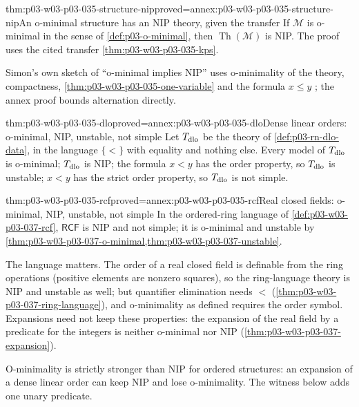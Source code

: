 \begin{hbcorollary}{thm:p03-w03-p03-035-structure-nip}{proved=annex:p03-w03-p03-035-structure-nip}{An o-minimal structure has an NIP theory, given the transfer}
If \(\mathcal M\) is o-minimal in the sense of \cref{def:p03-o-minimal}, then
\(\operatorname{Th}(\mathcal M)\) is NIP.  The proof uses the cited transfer
\cref{thm:p03-w03-p03-035-kps}.
\end{hbcorollary}

Simon's own sketch of ``o-minimal implies NIP'' uses o-minimality of the
theory, compactness, \cref{thm:p03-w03-p03-035-one-variable} and the
formula \(x\leq y\) \cite[Example~2.12, p.~17]{Simon2015GuideManuscript}; the
annex proof bounds alternation directly.

\begin{hbtheorem}{thm:p03-w03-p03-035-dlo}{proved=annex:p03-w03-p03-035-dlo}{Dense linear orders: o-minimal, NIP, unstable, not simple}
Let \(T_{\rm dlo}\) be the theory of \cref{def:p03-rn-dlo-data}, in the
language \(\{<\}\) with equality and nothing else.  Every model of
\(T_{\rm dlo}\) is o-minimal; \(T_{\rm dlo}\) is NIP; the formula \(x<y\) has
the order property, so \(T_{\rm dlo}\) is unstable; \(x<y\) has the strict
order property, so \(T_{\rm dlo}\) is not simple.
\end{hbtheorem}

\begin{hbcorollary}{thm:p03-w03-p03-035-rcf}{proved=annex:p03-w03-p03-035-rcf}{Real closed fields: o-minimal, NIP, unstable, not simple}
In the ordered-ring language of \cref{def:p03-w03-p03-037-rcf},
\(\mathsf{RCF}\) is NIP and not simple; it is o-minimal and unstable by
\cref{thm:p03-w03-p03-037-o-minimal,thm:p03-w03-p03-037-unstable}.
\end{hbcorollary}

The language matters.  The order of a real closed field is definable from
the ring operations (positive elements are nonzero squares), so the
ring-language theory is NIP and unstable as well; but quantifier elimination
needs \(<\) (\cref{thm:p03-w03-p03-037-ring-language}), and o-minimality as
defined requires the order symbol.  Expansions need not keep these
properties: the expansion of the real field by a predicate for the integers
is neither o-minimal nor NIP (\cref{thm:p03-w03-p03-037-expansion}).

O-minimality is strictly stronger than NIP for ordered structures: an
expansion of a dense linear order can keep NIP and lose o-minimality.  The
witness below adds one unary predicate.

